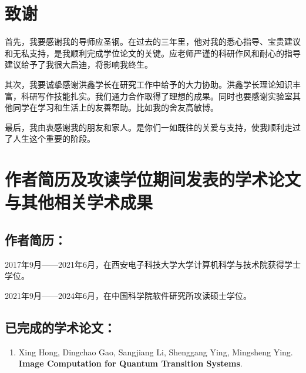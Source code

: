 
\chapter[致谢]{致\quad 谢}%

首先，我要感谢我的导师应圣钢。在过去的三年里，他对我的悉心指导、宝贵建议和无私支持，是我顺利完成学位论文的关键。应老师严谨的科研作风和耐心的指导建议给予了我很大启迪，将影响我终生。

其次，我要诚挚感谢洪鑫学长在研究工作中给予的大力协助。洪鑫学长理论知识丰富，科研写作技能扎实。我们通力合作取得了理想的成果。同时也要感谢实验室其他同学在学习和生活上的友善帮助。比如我的舍友高敏博。

最后，我由衷感谢我的朋友和家人。是你们一如既往的关爱与支持，使我顺利走过了人生这个重要的阶段。

\chapter{作者简历及攻读学位期间发表的学术论文与其他相关学术成果}

\section*{作者简历：}
2017年9月——2021年6月，在西安电子科技大学大学计算机科学与技术院获得学士学位。


2021年9月——2024年6月，在中国科学院软件研究所攻读硕士学位。


\section*{已完成的学术论文：}

{
\setlist[enumerate]{}%
\begin{enumerate}[nosep]
    \item Xing Hong, Dingchao Gao, Sangjiang Li, Shenggang Ying, Mingsheng Ying. \textbf{Image Computation for Quantum Transition Systems}.
\end{enumerate}
}





\cleardoublepage[plain]%
